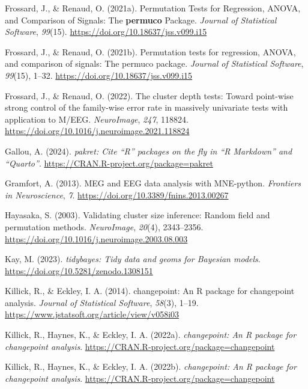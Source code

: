\documentclass[
  doc,
  floatsintext,
  longtable,
  a4paper,
  nolmodern,
  notxfonts,
  notimes,
  colorlinks=true,linkcolor=blue,citecolor=blue,urlcolor=blue]{apa7}
\newlength{\cslhangindent}
\newenvironment{CSLReferences}[2] %
 {\begin{list}{}{%
  \setlength{\itemindent}{0pt}
  \setlength{\leftmargin}{0pt}
  \setlength{\parsep}{0pt}
  \ifodd #1
   \setlength{\leftmargin}{\cslhangindent}
   \setlength{\itemindent}{-1\cslhangindent}
  \fi
  \setlength{\itemsep}{#2\baselineskip}}}
 {\end{list}}
\begin{document}
\begin{CSLReferences}{1}{0}
Frossard, J., \& Renaud, O. (2021a). Permutation Tests for Regression,
ANOVA, and Comparison of Signals: The {\textbf{permuco}} Package.
\emph{Journal of Statistical Software}, \emph{99}(15).
\url{https://doi.org/10.18637/jss.v099.i15}

Frossard, J., \& Renaud, O. (2021b). Permutation tests for regression,
{ANOVA}, and comparison of signals: The {permuco} package. \emph{Journal
of Statistical Software}, \emph{99}(15), 1--32.
\url{https://doi.org/10.18637/jss.v099.i15}

Frossard, J., \& Renaud, O. (2022). The cluster depth tests: Toward
point-wise strong control of the family-wise error rate in massively
univariate tests with application to M/EEG. \emph{NeuroImage},
\emph{247}, 118824.
\url{https://doi.org/10.1016/j.neuroimage.2021.118824}

Gallou, A. (2024). \emph{{pakret}: Cite {``{R}''} packages on the fly in
{``{R Markdown}''} and {``{Quarto}''}}.
\url{https://CRAN.R-project.org/package=pakret}

Gramfort, A. (2013). MEG and EEG data analysis with MNE-python.
\emph{Frontiers in Neuroscience}, \emph{7}.
\url{https://doi.org/10.3389/fnins.2013.00267}

Hayasaka, S. (2003). Validating cluster size inference: Random field and
permutation methods. \emph{NeuroImage}, \emph{20}(4), 2343--2356.
\url{https://doi.org/10.1016/j.neuroimage.2003.08.003}

Kay, M. (2023). \emph{{tidybayes}: Tidy data and geoms for {Bayesian}
models}. \url{https://doi.org/10.5281/zenodo.1308151}

Killick, R., \& Eckley, I. A. (2014). {changepoint}: An {R} package for
changepoint analysis. \emph{Journal of Statistical Software},
\emph{58}(3), 1--19.
\url{https://www.jstatsoft.org/article/view/v058i03}

Killick, R., Haynes, K., \& Eckley, I. A. (2022a). \emph{{changepoint}:
An {R} package for changepoint analysis}.
\url{https://CRAN.R-project.org/package=changepoint}

Killick, R., Haynes, K., \& Eckley, I. A. (2022b). \emph{{changepoint}:
An {R} package for changepoint analysis}.
\url{https://CRAN.R-project.org/package=changepoint}


\end{CSLReferences}
\end{document}
